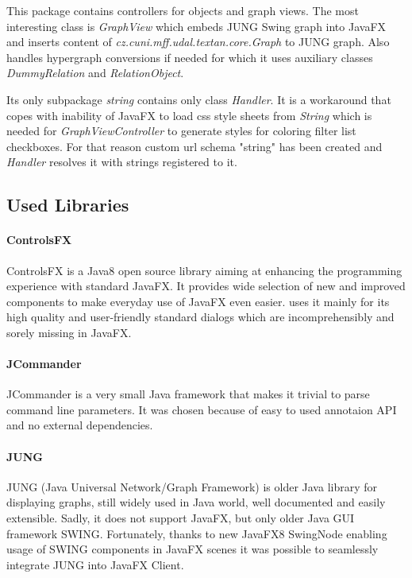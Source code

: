 This package contains controllers for objects and graph views. The most
interesting class is \emph{GraphView} which embeds JUNG Swing graph into JavaFX
and inserts content of \emph{cz.cuni.mff.udal.textan.core.Graph} to JUNG graph.
Also handles hypergraph conversions if needed for which it uses auxiliary
classes \emph{DummyRelation} and \emph{RelationObject}.

Its only subpackage \emph{string} contains only class \emph{Handler}. It is a
workaround that copes with inability of JavaFX to load css style sheets from
\emph{String} which is needed for \emph{GraphViewController} to generate styles
for coloring filter list checkboxes. For that reason custom url schema "string"
has been created and \emph{Handler} resolves it with strings registered to it.

\subsection{Used Libraries}
\label{ssec:UsedLibraries}


\paragraph{ControlsFX}
ControlsFX is a Java8 open source library aiming at enhancing the programming
experience with standard JavaFX. It provides wide selection of new and improved
components to make everyday use of JavaFX even easier. \textan{} uses it mainly
for its high quality and user-friendly standard dialogs which are
incomprehensibly and sorely missing in JavaFX.

\paragraph{JCommander}
JCommander is a very small Java framework that makes it trivial to parse command
line parameters. It was chosen because of easy to used annotaion API and no
external dependencies.

\paragraph{JUNG}
JUNG (Java Universal Network/Graph Framework) is older Java library for
displaying graphs, still widely used in Java world, well documented and easily
extensible. Sadly, it does not support JavaFX, but only older Java GUI framework
SWING. Fortunately, thanks to new JavaFX8 SwingNode enabling usage of SWING
components in JavaFX scenes it was possible to seamlessly integrate JUNG into
JavaFX \textan{} Client.

